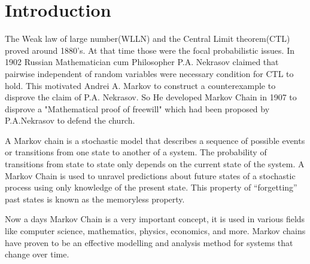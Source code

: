 \chapter{Introduction}
The Weak law of large number(WLLN) and the Central Limit theorem(CTL) proved around  1880's. At that time those were the focal probabilistic issues.
In 1902 Russian Mathematician cum Philosopher P.A. Nekrasov claimed that pairwise independent of random variables were necessary condition for CTL to hold. 
This motivated Andrei A. Markov to construct a counterexample to disprove the claim of P.A. Nekrasov. So He developed Markov Chain in 1907 to disprove a 
"Mathematical proof of freewill" which had been proposed by P.A.Nekrasov to defend the church.

 A Markov chain is a stochastic model that describes a sequence of possible
events or transitions from one state to another of a system. The probability of transitions
from state to state only depends on the current state of the system. A Markov Chain is
used to unravel predictions about future states of a stochastic process using only knowledge
of the present state. This property of “forgetting” past states is known as the memoryless
property.

Now a days Markov Chain is a very important concept, it is used in various fields like computer science, mathematics, physics, economics, and more.
Markov chains have proven to be an effective modelling and analysis method for systems that change over time.

